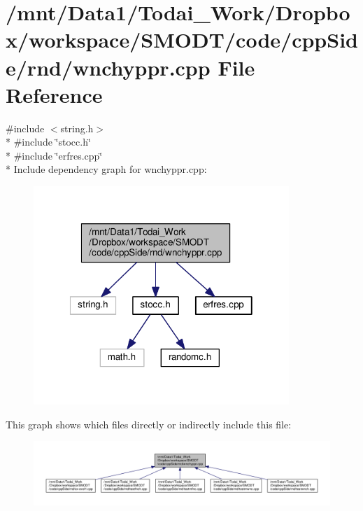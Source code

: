 \section{/mnt/\-Data1/\-Todai\-\_\-\-Work/\-Dropbox/workspace/\-S\-M\-O\-D\-T/code/cpp\-Side/rnd/wnchyppr.cpp File Reference}
\label{rnd_2wnchyppr_8cpp}
{\ttfamily \#include $<$string.\-h$>$}\\*
{\ttfamily \#include \char`\"{}stocc.\-h\char`\"{}}\\*
{\ttfamily \#include \char`\"{}erfres.\-cpp\char`\"{}}\\*
Include dependency graph for wnchyppr.\-cpp\-:\nopagebreak
\begin{figure}[H]
\begin{center}
\leavevmode
\includegraphics[width=274pt]{rnd_2wnchyppr_8cpp__incl}
\end{center}
\end{figure}
This graph shows which files directly or indirectly include this file\-:\nopagebreak
\begin{figure}[H]
\begin{center}
\leavevmode
\includegraphics[width=350pt]{rnd_2wnchyppr_8cpp__dep__incl}
\end{center}
\end{figure}
